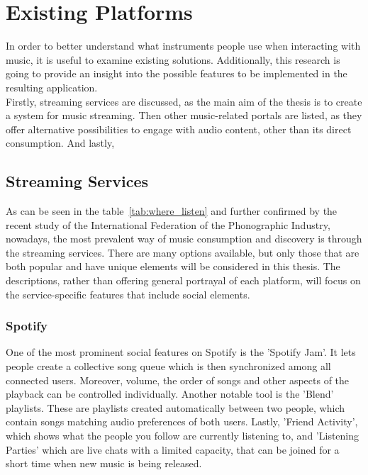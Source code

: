 \chapter{Existing Platforms}\label{chap:platforms}
In order to better understand what instruments people use when interacting with music,
it is useful to examine existing solutions. Additionally, this research is going to provide an insight
into the possible features to be implemented in the resulting application.\\
Firstly, streaming services are discussed, as the main aim of the thesis is to create a system for music streaming.
Then other music-related portals are listed, as they offer alternative possibilities to engage with audio content,
other than its direct consumption.
And lastly,



\section{Streaming Services}
As can be seen in the table~\ref{tab:where_listen} and further confirmed by
the recent study of the International Federation of the Phonographic Industry\cite{music_stats_2024},
nowadays, the most prevalent way of music consumption
and discovery is through the streaming services. There are many options available,
but only those that are both popular and have unique elements will be considered in this thesis.
The descriptions, rather than offering general portrayal of each platform,
will focus on the service-specific features that include social elements.

\subsection{Spotify}
One of the most prominent social features on Spotify is the 'Spotify Jam'\cite{spotify_jam}.
It lets people create a collective song queue which is then synchronized among all connected users.
Moreover, volume, the order of songs and other aspects of the playback can be controlled individually.
Another notable tool is the 'Blend' playlists\cite{spotify_recs}. These are playlists created automatically
between two people, which contain songs matching audio preferences of both users.
Lastly, 'Friend Activity'\cite{spotify_friend_activ}, which shows what the people you follow are currently listening to,
and 'Listening Parties' which are live chats with a limited capacity,
that can be joined for a short time when new music is being released\cite{spotify_party_1,spotify_party_2}.

